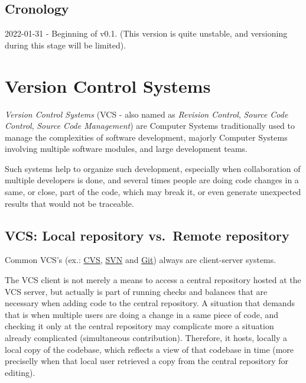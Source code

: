 \documentclass[
]{book}
\begin{document}
\hypertarget{cronology}{%
\section{Cronology}\label{cronology}}

2022-01-31 - Beginning of v0.1. (This version is quite unstable, and versioning
during this stage will be limited).

\hypertarget{version-control-systems}{%
\chapter{Version Control Systems}\label{version-control-systems}}

\emph{Version Control Systems} \citet{wiki_version_control} (VCS - also named as \emph{Revision Control},
\emph{Source Code Control}, \emph{Source Code Management}) are Computer Systems
traditionally used to manage the complexities of software development, majorly
Computer Systems involving multiple software modules, and large development teams.

Such systems help to organize such development, especially when collaboration of
multiple developers is done, and several times people are doing code changes in
a same, or close, part of the code, which may break it, or even generate
unexpected results that would not be traceable.

\hypertarget{vcs-local-repository-vs.-remote-repository}{%
\section{VCS: Local repository vs.~Remote repository}\label{vcs-local-repository-vs.-remote-repository}}

Common VCS's (ex.: \href{https://en.wikipedia.org/wiki/Concurrent_Versions_System}{CVS},
\href{https://en.wikipedia.org/wiki/Concurrent_Versions_System}{SVN} and
\href{https://en.wikipedia.org/wiki/Git}{Git}) always are client-server systems.

The VCS client is not merely a means to access a central repository hosted
at the VCS server, but actually is part of running checks and balances that are
necessary when adding code to the central repository. A situation that demands that
is when multiple users are doing a change in a same piece of code, and checking
it only at the central repository may complicate more a situation already
complicated (simultaneous contribution). Therefore, it hosts, locally
a local copy of the codebase, which reflects a view of that codebase in time
(more preciselly when that local user retrieved a copy from the central repository
for editing).
\end{document}
